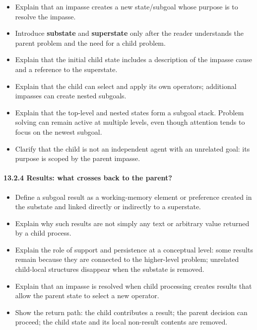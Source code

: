 \begin{itemize}
\tightlist
\item
  Explain that an impasse creates a new state/subgoal whose purpose is to resolve the impasse.
\item
  Introduce \textbf{substate} and \textbf{superstate} only after the reader understands the parent problem and the need for a child problem.
\item
  Explain that the initial child state includes a description of the impasse cause and a reference to the superstate.
\item
  Explain that the child can select and apply its own operators; additional impasses can create nested subgoals.
\item
  Explain that the top-level and nested states form a subgoal stack. Problem solving can remain active at multiple levels, even though attention tends to focus on the newest subgoal.
\item
  Clarify that the child is not an independent agent with an unrelated goal: its purpose is scoped by the parent impasse.
\end{itemize}

\paragraph{13.2.4 Results: what crosses back to the parent?}\label{1324-results-what-crosses-back-to-the-parent}

\begin{itemize}
\tightlist
\item
  Define a subgoal result as a working-memory element or preference created in the substate and linked directly or indirectly to a superstate.
\item
  Explain why such results are not simply any text or arbitrary value returned by a child process.
\item
  Explain the role of support and persistence at a conceptual level: some results remain because they are connected to the higher-level problem; unrelated child-local structures disappear when the substate is removed.
\item
  Explain that an impasse is resolved when child processing creates results that allow the parent state to select a new operator.
\item
  Show the return path: the child contributes a result; the parent decision can proceed; the child state and its local non-result contents are removed.
\end{itemize}

